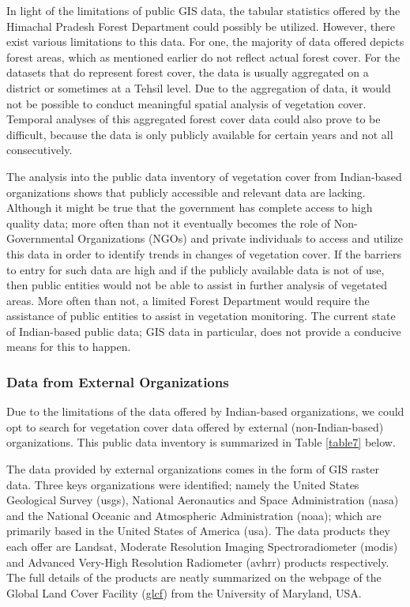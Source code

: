 \justify
In light of the limitations of public GIS data, the tabular statistics offered by the Himachal Pradesh Forest Department could possibly be utilized. However, there exist various limitations to this data. For one, the majority of data offered depicts forest areas, which as mentioned earlier do not reflect actual forest cover. For the datasets that do represent forest cover, the data is usually aggregated on a district or sometimes at a Tehsil level. Due to the aggregation of data, it would not be possible to conduct meaningful spatial analysis of vegetation cover. Temporal analyses of this aggregated forest cover data could also prove to be difficult, because the data is only publicly available for certain years and not all consecutively.

\justify 
The analysis into the public data inventory of vegetation cover from Indian-based organizations shows that publicly accessible and relevant data are lacking. Although it might be true that the government has complete access to high quality data; more often than not it eventually becomes the role of Non-Governmental Organizations (NGOs) and private individuals to access and utilize this data in order to identify trends in changes of vegetation cover. If the barriers to entry for such data are high and if the publicly available data is not of use, then public entities would not be able to assist in further analysis of vegetated areas. More often than not, a limited Forest Department would require the assistance of public entities to assist in vegetation monitoring. The current state of Indian-based public data; GIS data in particular, does not provide a conducive means for this to happen.

\subsubsection{Data from External Organizations}

\justify 
Due to the limitations of the data offered by Indian-based organizations, we could opt to search for vegetation cover data offered by external (non-Indian-based) organizations. This public data inventory is summarized in Table \ref{table7} below.

\justify
The data provided by external organizations comes in the form of GIS raster data. Three keys organizations were identified; namely the United States Geological Survey (\ac{usgs}), National Aeronautics and Space Administration (\ac{nasa}) and the National Oceanic and Atmospheric Administration (\ac{noaa}); which are primarily based in the United States of America (\ac{usa}). The data products they each offer are Landsat, Moderate Resolution Imaging Spectroradiometer (\ac{modis}) and Advanced Very-High Resolution Radiometer (\ac{avhrr}) products respectively. The full details of the products are neatly summarized on the webpage of the Global Land Cover Facility (\href{http://glcf.umd.edu/data/}{\ac{glcf}}) from the University of Maryland, USA.


